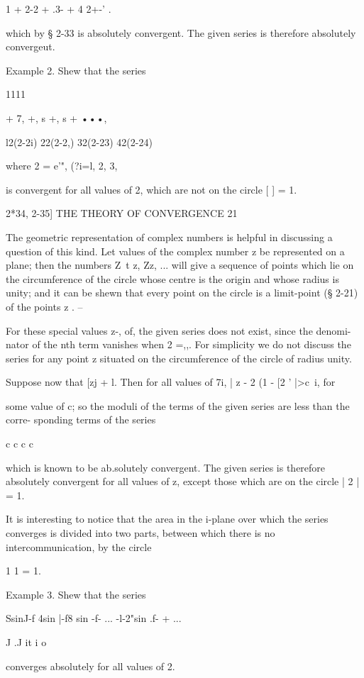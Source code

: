1 + 2-2 + .3- + 4 2+-' .

which by § 2-33 is absolutely convergent. The given series is
therefore absolutely convergeut.

Example 2. Shew that the series

1111

+ 7, +, s +, s + •••,



l2(2-2i) 22(2-2,) 32(2-23) 42(2-24)

where 2 = e'", (?i=l, 2, 3,

is convergent for all values of 2, which are not on the circle [ ] =
1.



2*34, 2-35] THE THEORY OF CONVERGENCE 21

The geometric representation of complex numbers is helpful in
discussing a question of this kind. Let values of the complex number z
be represented on a plane; then the numbers Z\ t z, Zz, ... will
give a sequence of points which lie on the circumference of the circle
whose centre is the origin and whose radius is unity; and it can be
shewn that every point on the circle is a limit-point (§ 2-21) of the
points z . --

For these special values z-, of, the given series does not exist,
since the denomi- nator of the nth term vanishes when 2 =,,. For
simplicity we do not discuss the series for any point z situated on
the circumference of the circle of radius unity.

Suppose now that [zj + l. Then for all values of 7i, | z - 2 (1 - [2 '
|>c~i, for

some value of c; so the moduli of the terms of the given series are
less than the corre- sponding terms of the series

c c c c

which is known to be ab.solutely convergent. The given series is
therefore absolutely convergent for all values of z, except those
which are on the circle | 2 | = 1.

It is interesting to notice that the area in the i-plane over which
the series converges is divided into two parts, between which there is
no intercommunication, by the circle

1 1 = 1.

Example 3. Shew that the series

SsinJ-f 4sin |-f8 sin -f- ... -l-2"sin .f- + ...

 J .J it i o

converges absolutely for all values of 2.

